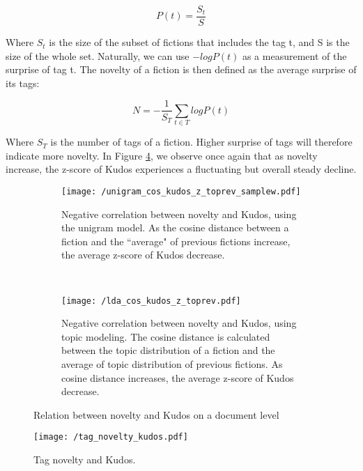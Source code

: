 \documentclass[a4paper]{article}
\begin{document}
\begin{equation}
P(t) = \frac{S_t}{S}
\end{equation}

Where $S_t$ is the size of the subset of fictions that includes the tag t, and S is the size of the whole set. Naturally, we can use $-logP(t)$ as a measurement of the surprise of tag t. The novelty of a fiction is then defined as the average surprise of its tags:

\begin{equation}
N = -\frac{1}{S_T}\sum_{t \in{T}} logP(t)
\end{equation}

Where $S_T$ is the number of tags of a fiction. Higher surprise of tags will therefore indicate more novelty. In Figure \ref{fig:tag_novelty}, we observe once again that as novelty increase, the z-score of Kudos experiences a fluctuating but overall steady decline.


\begin{figure}
    \centering
    \begin{subfigure}[b]{0.7\textwidth}
        \texttt{[image: /unigram\_cos\_kudos\_z\_toprev\_samplew.pdf]}
        \caption{Negative correlation between novelty and Kudos, using the unigram model. As the cosine distance between a fiction and the ``average" of previous fictions increase, the average z-score of Kudos decrease.}
        \label{fig:unigram_cos}
    \end{subfigure}
    ~ %
    \begin{subfigure}[b]{0.7\textwidth}
        \texttt{[image: /lda\_cos\_kudos\_z\_toprev.pdf]}
        \caption{Negative correlation between novelty and Kudos, using topic modeling. The cosine distance is calculated between the topic distribution of a fiction and the average of topic distribution of previous fictions. As cosine distance increases, the average z-score of Kudos decrease.}
        \label{fig:lda_cos}
    \end{subfigure}
    \caption{Relation between novelty and Kudos on a document level}\label{fig:novelty_kudos_doc}
\end{figure}

\begin{figure}[htbp]
\begin{center}
\texttt{[image: /tag\_novelty\_kudos.pdf]}
\caption{Tag novelty and Kudos. }
\label{fig:tag_novelty}
\end{center}
\end{figure}
\end{document}
